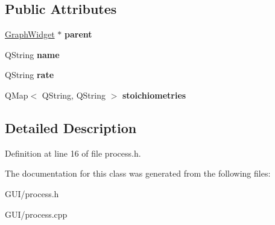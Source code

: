 \subsection*{Public Attributes}
\begin{DoxyCompactItemize}
\item 
\mbox{\label{class_process_a20984c82a6540cbf519855c80b02a98a}} 
\hyperlink{class_graph_widget}{Graph\+Widget} $\ast$ {\bfseries parent}
\item 
\mbox{\label{class_process_a91d09abb711ed7037751ee2e13889353}} 
Q\+String {\bfseries name}
\item 
\mbox{\label{class_process_a14a58e89ea08cd8a666fa7cc2d227611}} 
Q\+String {\bfseries rate}
\item 
\mbox{\label{class_process_a7fb904c7e078b17397d118d7c309b126}} 
Q\+Map$<$ Q\+String, Q\+String $>$ {\bfseries stoichiometries}
\end{DoxyCompactItemize}


\subsection{Detailed Description}


Definition at line 16 of file process.\+h.



The documentation for this class was generated from the following files\+:\begin{DoxyCompactItemize}
\item 
G\+U\+I/process.\+h\item 
G\+U\+I/process.\+cpp\end{DoxyCompactItemize}
